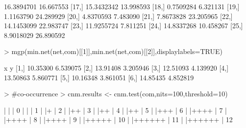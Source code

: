 \documentclass[12pt]{article}
\begin{document}
\begin{Schunk}
\begin{Soutput}
[16,] 16.3894701 16.667553
[17,] 15.3432342 13.998593
[18,]  0.7509284  6.321131
[19,]  1.1163790 24.289929
[20,]  4.8370593  7.483090
[21,]  7.8673828 23.205965
[22,] 14.1453099 22.983747
[23,] 11.9255724  7.811251
[24,] 14.8337268 10.458267
[25,]  8.9018029 26.890592
\end{Soutput}
\begin{Sinput}
> mgp(min.net(net,com)[[1]],min.net(net,com)[[2]],displaylabels=TRUE)
\end{Sinput}
\begin{Soutput}
            x        y
[1,] 10.35300 6.539075
[2,] 13.91408 3.205946
[3,] 12.51093 4.139920
[4,] 13.50863 5.860771
[5,] 10.16348 3.861051
[6,] 14.85435 4.852819
\end{Soutput}
\begin{Sinput}
>                                         #co-occurrence
> cnm.results <- cnm.test(com,nits=100,threshold=10)
\end{Sinput}
\begin{Soutput}
  |                                                        
  |                                                  |   0%
  |                                                        
  |                                                  |   1%
  |                                                        
  |+                                                 |   2%
  |                                                        
  |++                                                |   3%
  |                                                        
  |++                                                |   4%
  |                                                        
  |++                                                |   5%
  |                                                        
  |+++                                               |   6%
  |                                                        
  |++++                                              |   7%
  |                                                        
  |++++                                              |   8%
  |                                                        
  |++++                                              |   9%
  |                                                        
  |+++++                                             |  10%
  |                                                        
  |++++++                                            |  11%
  |                                                        
  |++++++                                            |  12%

\end{Soutput}
\end{Schunk}
\end{document}

